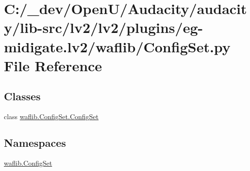 \hypertarget{lv2_2plugins_2eg-midigate_8lv2_2waflib_2_config_set_8py}{}\section{C\+:/\+\_\+dev/\+Open\+U/\+Audacity/audacity/lib-\/src/lv2/lv2/plugins/eg-\/midigate.lv2/waflib/\+Config\+Set.py File Reference}
\label{lv2_2plugins_2eg-midigate_8lv2_2waflib_2_config_set_8py}
\subsection*{Classes}
\begin{DoxyCompactItemize}
\item 
class \hyperlink{classwaflib_1_1_config_set_1_1_config_set}{waflib.\+Config\+Set.\+Config\+Set}
\end{DoxyCompactItemize}
\subsection*{Namespaces}
\begin{DoxyCompactItemize}
\item 
 \hyperlink{namespacewaflib_1_1_config_set}{waflib.\+Config\+Set}
\end{DoxyCompactItemize}
